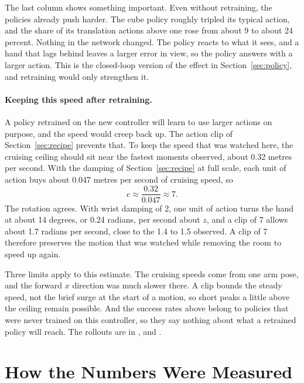 The last column shows something important. Even without retraining, the policies already push harder. The cube policy roughly tripled its typical action, and the share of its translation actions above one rose from about 9 to about 24 percent. Nothing in the network changed. The policy reacts to what it sees, and a hand that lags behind leaves a larger error in view, so the policy answers with a larger action. This is the closed-loop version of the effect in Section~\ref{sec:policy}, and retraining would only strengthen it.

\paragraph{Keeping this speed after retraining.} A policy retrained on the new controller will learn to use larger actions on purpose, and the speed would creep back up. The action clip of Section~\ref{sec:recipe} prevents that. To keep the speed that was watched here, the cruising ceiling should sit near the fastest moments observed, about 0.32 metres per second. With the damping of Section~\ref{sec:recipe} at full scale, each unit of action buys about 0.047 metres per second of cruising speed, so
\begin{equation}
c \approx \frac{0.32}{0.047} \approx 7 .
\end{equation}
The rotation agrees. With wrist damping of 2, one unit of action turns the hand at about 14 degrees, or 0.24 radians, per second about $z$, and a clip of 7 allows about 1.7 radians per second, close to the 1.4 to 1.5 observed. A clip of 7 therefore preserves the motion that was watched while removing the room to speed up again.

Three limits apply to this estimate. The cruising speeds come from one arm pose, and the forward $x$ direction was much slower there. A clip bounds the steady speed, not the brief surge at the start of a motion, so short peaks a little above the ceiling remain possible. And the success rates above belong to policies that were never trained on this controller, so they say nothing about what a retrained policy will reach. The rollouts are in ,  and .

\section*{How the Numbers Were Measured}

